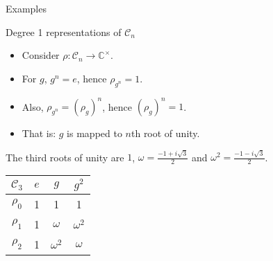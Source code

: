 \documentclass[10pt]{beamer}
\newcommand{\Cyc}{\mathcal{C}}
\newcommand{\CC}{\mathbb{C}}
\begin{document}
	\begin{frame}{Examples}
%				
%		
		\begin{block}{Degree 1 representations of $\Cyc_n$}
			\begin{itemize}
				\item Consider $\rho: \Cyc_n \rightarrow \CC^\times$.\pause
				
				\item For $g$, $g^n = e$, hence $\rho_{g^n} = 1$. 
				
				\item Also, $\rho_{g^n} = (\rho_g)^n$, hence $(\rho_g)^n = 1$.\pause
				
				\item That is: $g$ is mapped to $n$th root of unity.
			\end{itemize}
		\end{block}\pause
		
		\begin{example}[$\Cyc_3$]
			The third roots of unity are $1$, $\omega = \frac{-1+i\sqrt{3}}{2}$ and $\omega^2 = \frac{-1-i\sqrt{3}}{2}$.
			\begin{table}
				\centering
				\begin{tabular}{c | c c c}
					$\Cyc_3$ & $e$ & $g$        & $g^2$      \\ \hline
					$\rho_0$          & 1   & 1          & 1          \\
					$\rho_1$          & 1   & $\omega$   & $\omega^2$ \\
					$\rho_2$          & 1   & $\omega^2$ & $\omega$
				\end{tabular}
			\end{table}
		\end{example}
		
		

\end{frame}
\end{document}
